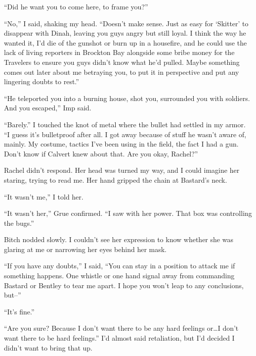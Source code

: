 ``Did he want you to come here, to frame you?''



``No,'' I said, shaking my head.  ``Doesn't make sense.  Just as easy for `Skitter' to disappear with Dinah, leaving you guys angry but still loyal.  I think the way he wanted it, I'd die of the gunshot or burn up in a housefire, and he could use the lack of living reporters in Brockton Bay alongside some bribe money for the Travelers to ensure you guys didn't know what he'd pulled.  Maybe something comes out later about me betraying you, to put it in perspective and put any lingering doubts to rest.''



``He teleported you into a burning house, shot you, surrounded you with soldiers.  And you escaped,'' Imp said.



``Barely.''  I touched the knot of metal where the bullet had settled in my armor.  ``I guess it's bulletproof after all.  I got away because of stuff he wasn't aware of, mainly.  My costume, tactics I've been using in the field, the fact I had a gun.  Don't know if Calvert knew about that.  Are you okay, Rachel?''



Rachel didn't respond.  Her head was turned my way, and I could imagine her staring, trying to read me.  Her hand gripped the chain at Bastard's neck.



``It wasn't me,'' I told her.



``It wasn't her,'' Grue confirmed.  ``I saw with her power.  That box was controlling the bugs.''



Bitch nodded slowly.  I couldn't see her expression to know whether she was glaring at me or narrowing her eyes behind her mask.



``If you have any doubts,'' I said, ``You can stay in a position to attack me if something happens.  One whistle or one hand signal away from commanding Bastard or Bentley to tear me apart.  I hope you won't leap to any conclusions, but--''



``It's fine.''



``Are you sure?  Because I don't want there to be any hard feelings or\ldots I don't want there to be hard feelings.''  I'd almost said retaliation, but I'd decided I didn't want to bring that up.



